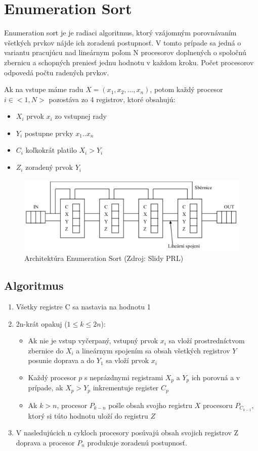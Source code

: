 \documentclass[a4paper,11pt]{article}
\begin{document}
\section{Enumeration Sort}
Enumeration sort je je radiaci algoritmus, ktorý vzájomným porovnávaním všetkých prvkov nájde ich zoradenú postupnosť. V tomto prípade sa jedná o variantu pracujúcu nad lineárnym poľom N procesorov doplnených o spoločnú zbernicu a schopných preniesť jednu hodnotu v každom kroku. Počet procesorov odpovedá počtu radených prvkov.

Ak na vstupe máme radu $X=(x_1, x_2, ..., x_n)$, potom každý procesor $i \in <1,N>$ pozostáva zo 4 registrov, ktoré obsahujú:
\begin{itemize}
\item $X_i$ prvok $x_i$ zo vstupnej rady
\item $Y_i$ postupne prvky $x_1$..$x_n$
\item $C_i$ koľkokrát platilo $X_i > Y_i$
\item $Z_i$ zoradený prvok $Y_i$
\end{itemize}

\begin{figure}[!htb]
\centering
\includegraphics[width=\textwidth]{es.png}
\caption{Architektúra Enumeration Sort (Zdroj: Slidy PRL)}
\end{figure}

\subsection{Algoritmus}
\begin{enumerate}
\item Všetky registre C sa nastavia na hodnotu 1
\item 2n-krát opakuj ($ 1 \leq k \leq 2n$):
\begin{itemize}
\item Ak nie je vstup vyčerpaný, vstupný prvok $x_i$ sa vloží prostredníctvom zbernice do $X_i$ a lineárnym spojením sa obsah všetkých registrov $Y$ posunie doprava a do $Y_1$ sa vloží prvok $x_i$
\item Každý procesor $p$ s neprázdnymi registrami $X_p$ a $Y_p$ ich porovná a v prípade, ak $X_p > Y_p$ inkrementuje register $C_p$
\item Ak $k > n$, procesor $P_{k-n}$ pošle obsah svojho registru $X$ procesoru $P_{C_{k-1}}$, ktorý si túto hodnotu uloží do registru $Z$
\end{itemize}
\item V nasledujúcich n cykloch procesory posúvajú obsah svojich registrov Z doprava a procesor $P_n$ produkuje zoradenú postupnosť.
\end{enumerate}
\end{document}
